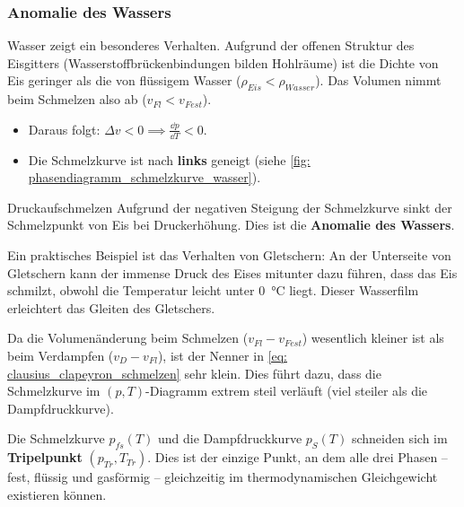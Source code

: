 \subsubsection{Anomalie des Wassers}
Wasser zeigt ein besonderes Verhalten. Aufgrund der offenen Struktur des Eisgitters (Wasserstoffbrückenbindungen bilden Hohlräume) ist die Dichte von Eis geringer als die von flüssigem Wasser ($\rho_{Eis} < \rho_{Wasser}$). Das Volumen nimmt beim Schmelzen also ab ($v_{Fl} < v_{Fest}$).
\begin{itemize}
    \item Daraus folgt: $\Delta v < 0 \implies \frac{\dd p}{\dd T} < 0$.
    \item Die Schmelzkurve ist nach \textbf{links} geneigt (siehe \cref{fig: phasendiagramm_schmelzkurve_wasser}).
\end{itemize}

\begin{rememberbox}{Druckaufschmelzen}
    Aufgrund der negativen Steigung der Schmelzkurve sinkt der Schmelzpunkt von Eis bei Druckerhöhung. Dies ist die \textbf{Anomalie des Wassers}.
    
    Ein praktisches Beispiel ist das Verhalten von Gletschern: An der Unterseite von Gletschern kann der immense Druck des Eises mitunter dazu führen, dass das Eis schmilzt, obwohl die Temperatur leicht unter \SI{0}{\celsius} liegt. Dieser Wasserfilm erleichtert das Gleiten des Gletschers.
\end{rememberbox}

Da die Volumenänderung beim Schmelzen ($v_{Fl} - v_{Fest}$) wesentlich kleiner ist als beim Verdampfen ($v_{D} - v_{Fl}$), ist der Nenner in \cref{eq: clausius_clapeyron_schmelzen} sehr klein. Dies führt dazu, dass die Schmelzkurve im $(p,T)$-Diagramm extrem steil verläuft (viel steiler als die Dampfdruckkurve).

Die Schmelzkurve $p_{fs}(T)$ und die Dampfdruckkurve $p_S(T)$ schneiden sich im \textbf{Tripelpunkt} $(p_{Tr}, T_{Tr})$. Dies ist der einzige Punkt, an dem alle drei Phasen -- fest, flüssig und gasförmig -- gleichzeitig im thermodynamischen Gleichgewicht existieren können.

\newpage